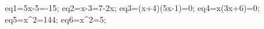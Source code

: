 \documentclass[exercice]{thedocument}%
\begin{document}
%
    \>eq1=5x-5=-15;%
    \>eq2=x-3=7-2x;%
    \>eq3=(x+4)(5x-1)=0;%
    \>eq4=x(3x+6)=0;%
    \>eq5=x^2=144;%
    \>eq6=x^2=5;%
\end{document}
